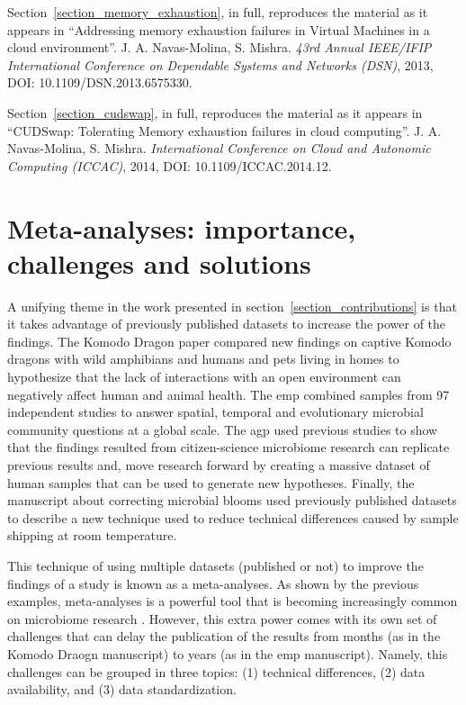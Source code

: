 \documentclass[12pt,chapterheads]{ucsd}
\begin{document}
Section~\ref{section_memory_exhaustion}, in full, reproduces the material as it
appears in ``Addressing memory exhaustion failures in Virtual Machines in a cloud environment''.
J. A. Navas-Molina, S. Mishra. \emph{43rd Annual IEEE/IFIP International Conference on Dependable Systems and Networks (DSN)},
2013, DOI: 10.1109/DSN.2013.6575330.

Section~\ref{section_cudswap}, in full, reproduces the material as it
appears in ``CUDSwap: Tolerating Memory exhaustion failures in cloud computing''.
J. A. Navas-Molina, S. Mishra. \emph{International Conference on Cloud and Autonomic Computing (ICCAC)},
2014, DOI: 10.1109/ICCAC.2014.12.




\chapter{Meta-analyses: importance, challenges and solutions}\label{chapter_qiita}
\glsresetall
A unifying theme in the work presented in section~\ref{section_contributions}
is that it takes advantage of previously published datasets to increase the power
of the findings. The Komodo Dragon paper \cite{Hyde2016} compared new findings
on captive Komodo dragons with wild amphibians \cite{Kueneman2014} and humans and
pets living in homes \cite{Lax2014} to hypothesize that the lack of interactions
with an open environment can negatively affect human and animal health. The \gls{emp}
\cite{Gilbert2010, Gilbert2014, Thompson2017} combined samples from 97 independent
studies to answer spatial, temporal and evolutionary microbial community questions at a global scale.
The \gls{agp} used previous studies to show that the findings resulted from citizen-science
microbiome research can replicate previous results and, move research forward
by creating a massive dataset of human samples that can be used to
generate new hypotheses. Finally, the manuscript about correcting microbial blooms
\cite{Amir2017Bloom} used previously published datasets to describe a new technique
used to reduce technical differences caused by sample shipping at room temperature.

This technique of using multiple datasets (published or not)
to improve the findings of a study is known as a meta-analyses. As shown
by the previous examples, meta-analyses is a powerful tool that is becoming increasingly
common on microbiome research \cite{Lozupone2007, Ley2008, Sinha2017}. However,
this extra power comes with its own set of challenges that can delay the publication
of the results from months (as in the Komodo Draogn manuscript) to years (as in
the \gls{emp} manuscript). Namely, this challenges can be grouped in three topics:
(1) technical differences, (2) data availability, and (3) data standardization.
\end{document}
